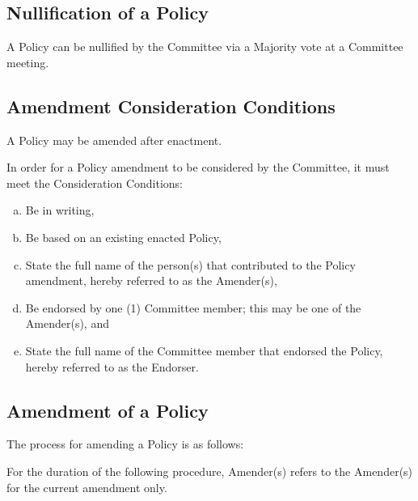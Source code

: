 \documentclass[a4paper,12pt]{article}
\begin{document}
\subsection{Nullification of a Policy}

A Policy can be nullified by the Committee via a Majority vote at a Committee meeting.

\subsection{Amendment Consideration Conditions}

A Policy may be amended after enactment.

In order for a Policy amendment to be considered by the Committee, it must meet the Consideration Conditions:

\begin{enumerate}[a)]
	\item Be in writing,
	\item Be based on an existing enacted Policy,
	\item State the full name of the person(s) that contributed to the Policy amendment, hereby referred to as the Amender(s),
	\item Be endorsed by one (1) Committee member; this may be one of the Amender(s), and
	\item State the full name of the Committee member that endorsed the Policy, hereby referred to as the Endorser.
\end{enumerate}

\subsection{Amendment of a Policy}

The process for amending a Policy is as follows:

For the duration of the following procedure, Amender(s) refers to the Amender(s) for the current amendment only.
\end{document}
